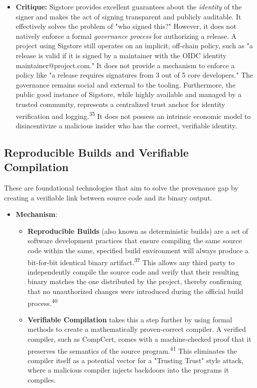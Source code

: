 \documentclass{article}
\begin{document}
\begin{itemize}
\item \textbf{Critique:} Sigstore provides excellent guarantees about the \emph{identity} of the signer and makes the act of signing transparent and publicly auditable. It effectively solves the problem of "who signed this?" However, it does not natively enforce a formal \emph{governance process} for authorizing a release. A project using Sigstore still operates on an implicit, off-chain policy, such as "a release is valid if it is signed by a maintainer with the OIDC identity maintainer@project.com." It does not provide a mechanism to enforce a policy like "a release requires signatures from 3 out of 5 core developers." The governance remains social and external to the tooling. Furthermore, the public good instance of Sigstore, while highly available and managed by a trusted community, represents a centralized trust anchor for identity verification and logging.\textsuperscript{35} It does not possess an intrinsic economic model to disincentivize a malicious insider who has the correct, verifiable identity.
\end{itemize}

\subsection{Reproducible Builds and Verifiable Compilation}

These are foundational technologies that aim to solve the provenance gap by creating a verifiable link between source code and its binary output.

\begin{itemize}
\item \textbf{Mechanism}:

\begin{itemize}
\item \textbf{Reproducible Builds} (also known as deterministic builds) are a set of software development practices that ensure compiling the same source code within the same, specified build environment will always produce a bit-for-bit identical binary artifact.\textsuperscript{37} This allows any third party to independently compile the source code and verify that their resulting binary matches the one distributed by the project, thereby confirming that no unauthorized changes were introduced during the official build process.\textsuperscript{40}
\item \textbf{Verifiable Compilation} takes this a step further by using formal methods to create a mathematically proven-correct compiler. A verified compiler, such as CompCert, comes with a machine-checked proof that it preserves the semantics of the source program.\textsuperscript{41} This eliminates the compiler itself as a potential vector for a "Trusting Trust" style attack, where a malicious compiler injects backdoors into the programs it compiles.
\end{itemize}
\end{itemize}
\end{document}
